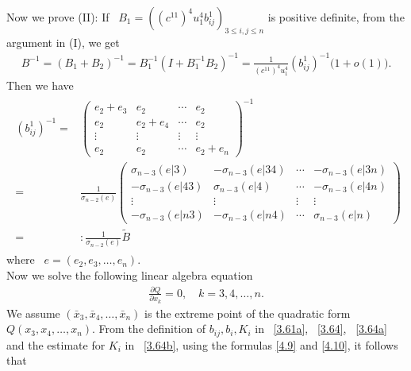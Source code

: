 \documentclass[11pt]{amsart}
\numberwithin{equation}{section}
\begin{document}
Now we prove   (II):
If  ~$B_1=((c^{11})^4u_1^4b^1_{ij})_{3\leq i,j\leq n}$  is positive definite, from the argument in (I), we get
\begin{align}\label{4.9}
B^{-1}=(B_1+B_2)^{-1}=B_1^{-1}(I+B_1^{-1}B_2)^{-1}=\frac{1}{(c^{11})^{4}u_1^{4}}(b^1_{ij})^{-1}\big(1+o(1)\big).
\end{align}
Then we have
\begin{align}\label{4.10}
\begin{split}
(b^1_{ij})^{-1}=&\left(\begin{array}{cccc}e_2+e_3&e_2&\cdots &e_2\\
e_2&e_2+e_4&\cdots &e_2\\
\vdots & \vdots & \vdots &\vdots \\
e_2&e_2&\cdots& e_2+e_n
\end{array}\right)^{-1}\\
=&\frac{1}{\sigma_{n-2}(e)}\left(\begin{array}{cccc}
\sigma_{n-3}(e|3)&-\sigma_{n-3}(e|34)&\cdots & -\sigma_{n-3}(e|3n)\\
-\sigma_{n-3}(e|43)&\sigma_{n-3}(e|4)&\cdots & -\sigma_{n-3}(e|4n)\\
\vdots & \vdots & \vdots &\vdots \\
-\sigma_{n-3}(e|n3)&-\sigma_{n-3}(e|n4)&\cdots & \sigma_{n-3}(e|n)
\end{array}\right)\\
=&:\frac{1}{\sigma_{n-2}(e)}\tilde{B}
\end{split}
\end{align}
where  ~$e=(e_2,e_3,\ldots,e_n)$.\\
Now we solve the following linear  algebra equation
\begin{align}\label{4.11}
\frac{\partial Q}{\partial x_k}=0,\quad k=3,4,\ldots,n.
\end{align}
 We assume $(\bar{x}_{3},\bar{x}_{4},\ldots,\bar{x}_{n})$ is the extreme point of the quadratic form $Q(x_3,x_4,\ldots,x_n)$.
From the definition of $b_{ij}, b_{i}, K_i$ in ~\eqref{3.61a}, ~\eqref{3.64}, ~\eqref{3.64a}  and the estimate for $K_i$ in ~\eqref{3.64b}, using the formulas \eqref{4.9} and \eqref{4.10}, it follows that
\end{document}
